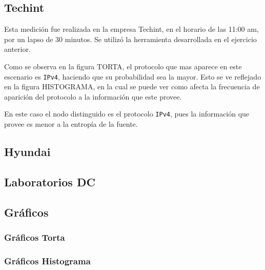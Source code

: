 \documentclass[final,narroweqnarray,inline]{ieee}
\begin{document}
  \subsection{Techint}
  Esta medición fue realizada en la empresa Techint, en el horario de las
  11:00 am, por un lapso de 30 minutos. Se utilizó la herramienta
  desarrollada en el ejercicio anterior. 

  
  Como se observa en la figura TORTA, el protocolo que mas aparece en
  este escenario es \texttt{IPv4}, haciendo que su probabilidad sea la
  mayor. Esto se ve reflejado en la figura HISTOGRAMA, en la cual se puede
  ver como afecta la frecuencia de aparición del protocolo a la información
  que este provee.

  En este caso el nodo distinguido es el protocolo \texttt{IPv4}, pues la
  información que provee es menor a la entropía de la fuente. 
  \subsection{Hyundai}

  \subsection{Laboratorios DC}

  \subsection{Gráficos}
  \subsubsection*{Gráficos Torta}
  \subsubsection*{Gráficos Histograma}

\end{document}
